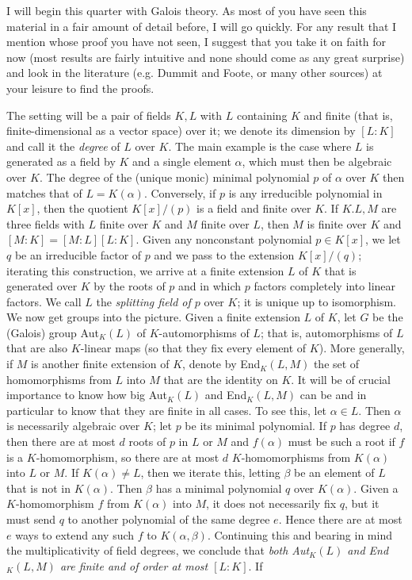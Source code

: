 I will begin this quarter with Galois theory.  As most of you have seen this material in a fair amount of detail before, I will go quickly.  For any result that I mention whose proof you have not seen, I suggest that you take it on faith for now (most results are fairly intuitive and none should come as any great surprise) and look in the literature (e.g. Dummit and Foote, or many other sources) at your leisure to find the proofs.

The setting will be a pair of fields $K,L$ with $L$ containing $K$ and finite (that is, finite-dimensional as a vector space) over it; we denote its dimension by $[L:K]$ and call it the {\sl degree} of $L$ over $K$.  The main example is the case where $L$ is generated as a field by $K$ and a single element $\alpha$, which must then be algebraic over $K$.  The degree of the (unique monic) minimal polynomial $p$ of $\alpha$ over $K$ then matches that of $L=K(\alpha)$.  Conversely, if $p$ is any irreducible polynomial in $K[x]$, then the quotient $K[x]/(p)$ is a field and finite over $K$.  If $K.L,M$ are three fields with $L$ finite over $K$ and $M$ finite over $L$, then $M$ is finite over $K$ and $[M:K]=[M:L][L:K]$.  Given any nonconstant polynomial $p\in K[x]$, we let $q$ be an irreducible factor of $p$ and we pass to the extension $K[x]/(q)$; iterating this construction, we arrive at a finite extension $L$ of $K$ that is generated over $K$ by the roots of $p$ and in which $p$ factors completely into linear factors.  We call $L$ the {\sl splitting field of $p$} over $K$; it is unique up to isomorphism.  We now get groups into the picture.  Given a finite extension $L$ of $K$, let $G$ be the (Galois) group Aut$_K(L)$ of $K$-automorphisms of $L$; that is, automorphisms of $L$ that are also $K$-linear maps (so that they fix every element of $K$).  More generally, if $M$ is another finite extension of $K$, denote by End$_K(L,M)$ the set of homomorphisms from $L$ into $M$ that are the identity on $K$.  It will be of crucial importance to know how big Aut$_K(L)$ and End$_K(L,M)$ can be and in particular to know that they are finite in all cases.  To see this, let $\alpha\in L$.  Then
$\alpha$ is necessarily algebraic over $K$; let $p$ be its minimal polynomial.  If $p$ has degree $d$, then there are at most $d$ roots of $p$ in $L$ or $M$ and $f(\alpha)$ must be such a root if $f$ is a
$K$-homomorphism, so there are at most $d$ $K$-homomorphisms from $K(\alpha)$ into $L$ or $M$.  If $K(\alpha)\ne L$, then we iterate this, letting $\beta$ be an element of $L$ that is not in $K(\alpha)$.  Then $\beta$ has a minimal polynomial $q$ over $K(\alpha)$.  Given a $K$-homomorphism $f$ from $K(\alpha)$ into $M$, it does not necessarily fix $q$, but it must send $q$ to another polynomial of the same degree $e$.  Hence there are at most $e$ ways to extend any such $f$ to $K(\alpha,\beta)$.  Continuing this and bearing in mind the multiplicativity of field degrees, we conclude that {\sl both Aut$_K(L)$ and End$_K(L,M)$ are finite and of order at most $[L:K]$}.  If
